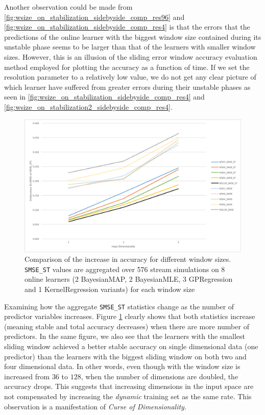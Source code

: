 Another observation could be made from \ref{fig:wsize_on_stabilization_sidebyside_comp_res96} and \ref{fig:wsize_on_stabilization_sidebyside_comp_res4} is that the errors that the predictions of the online learner with the biggest window size contained during its unstable phase seems to be larger than that of the learners with smaller window sizes. However, this is an illusion of the sliding error window accuracy evaluation method employed for plotting the accuracy as a function of time. If we set the resolution parameter to a relatively low value, we do not get any clear picture of which learner have suffered from greater errors during their unstable phases as seen in \ref{fig:wsize_on_stabilization_sidebyside_comp_res4} and \ref{fig:wsize_on_stabilization2_sidebyside_comp_res4}.

\begin{figure}[htbp]
  \centering
    \includegraphics[width=\linewidth]{./Figures/curse_of_dim.pdf}
  \caption{Comparison of the increase in accuracy for different window sizes. \texttt{SMSE\_ST} values are aggregated over 576 stream simulations on 8 online learners (2 BayesianMAP, 2 BayesianMLE, 3 GPRegression and 1 KernelRegression variants) for each window size}
  \label{fig:curse_of_dim}
\end{figure}

Examining how the aggregate \texttt{SMSE\_ST} statistics change as the number of predictor variables increases. Figure \ref{fig:curse_of_dim} clearly shows that both statistics increase (meaning stable and total accuracy decreases) when there are more number of predictors. In the same figure, we also see that the learners with the smallest sliding window achieved a better stable accuracy on single dimensional data (one predictor) than the learners with the biggest sliding window on both two and four dimensional data. In other words, even though with the window size is increased from $36$ to $128$, when the number of dimensions are doubled, the accuracy drops. This suggests that increasing dimensions in the input space are not compensated by increasing the \textit{dynamic} training set as the same rate. This observation is a manifestation of \textit{Curse of Dimensionality}.

